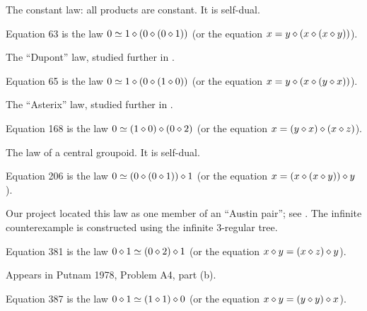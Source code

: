 The constant law: all products are constant. It is self-dual.

\begin{definition}[Equation 63]\label{eq63}\leanok{}  Equation 63 is the law $0 \simeq 1 \diamond (0 \diamond (0 \diamond 1))$ (or the equation $x = y \diamond (x \diamond (x \diamond y))$).
\end{definition}

The ``Dupont'' law, studied further in .

\begin{definition}[Equation 65]\label{eq65}\leanok{}  Equation 65 is the law $0 \simeq 1 \diamond (0 \diamond (1 \diamond 0))$ (or the equation $x = y \diamond (x \diamond (y \diamond x))$).
\end{definition}

The ``Asterix'' law, studied further in .

\begin{definition}[Equation 168]\label{eq168}\leanok{}  Equation 168 is the law $0  \simeq  (1 \diamond 0) \diamond (0 \diamond 2)$ (or the equation $x = (y \diamond x) \diamond (x \diamond z)$).
\end{definition}

The law of a central groupoid. It is self-dual.

\begin{definition}[Equation 206]\label{eq206}\leanok{}  Equation 206 is the law $0  \simeq  (0 \diamond (0 \diamond 1)) \diamond 1$ (or the equation $x = (x \diamond (x \diamond y)) \diamond y$).
\end{definition}

Our project located this law as one member of an ``Austin pair''; see . The infinite counterexample is constructed using the infinite 3-regular tree.

\begin{definition}[Equation 381]\label{eq381}\leanok{}  Equation 381 is the law $0 \diamond 1  \simeq  (0 \diamond 2) \diamond 1$ (or the equation $x \diamond y = (x \diamond z) \diamond y$).
\end{definition}

Appears in Putnam 1978, Problem A4, part (b).

\begin{definition}[Equation 387]\label{eq387}\leanok{}  Equation 387 is the law $0 \diamond 1  \simeq  (1 \diamond 1) \diamond 0$ (or the equation $x \diamond y = (y \diamond y) \diamond x$).
\end{definition}

